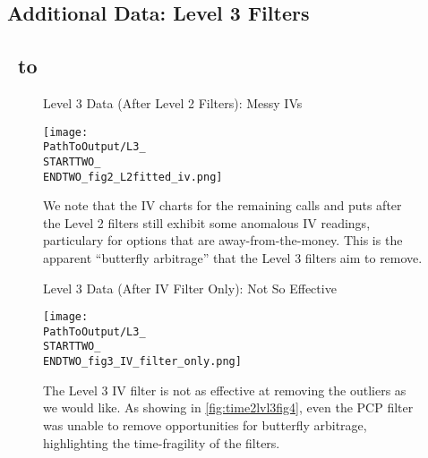 \begin{appendix}
\newpage
\section{Additional Data: Level 3 Filters}\label{app:lvl3}

\subsection{\STARTTWO\ to \ENDTWO }

\begin{figure}[H] %
  \centering
  \caption{Level 3 Data (After Level 2 Filters): Messy IVs}
  \texttt{[image: \\PathToOutput/L3\_\\STARTTWO\_\\ENDTWO\_fig2\_L2fitted\_iv.png]}
  \caption*{We note that the IV charts for the remaining calls and puts after the Level 2 filters still exhibit some anomalous IV readings, particulary for options that are away-from-the-money. This is the apparent ``butterfly arbitrage'' that the Level 3 filters aim to remove.}
  \label{fig:time2lvl3fig2}
\end{figure}


\begin{figure}[H] %
  \centering
  \caption{Level 3 Data (After IV Filter Only): Not So Effective}
  \texttt{[image: \\PathToOutput/L3\_\\STARTTWO\_\\ENDTWO\_fig3\_IV\_filter\_only.png]}
  \caption*{The Level 3 IV filter is not as effective at removing the outliers as we would like. As showing in \autoref{fig:time2lvl3fig4}, even the PCP filter was unable to remove opportunities for butterfly arbitrage, highlighting the time-fragility of the filters.}
  \label{fig:time2lvl3fig3}
\end{figure}

\newpage


\end{appendix}


